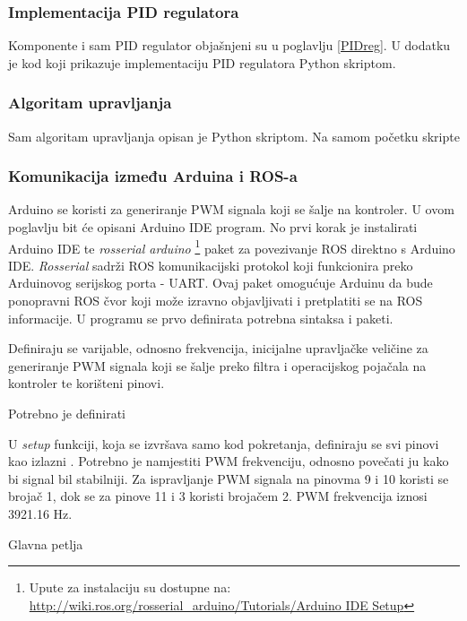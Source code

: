 \documentclass[times, utf8, diplomski]{fer}
\begin{document}
\subsubsection{Implementacija PID regulatora}
Komponente i sam PID regulator objašnjeni su u poglavlju \ref{PIDreg}. U dodatku je kod koji prikazuje implementaciju PID regulatora Python skriptom.
%

\subsubsection{Algoritam upravljanja}
Sam algoritam upravljanja opisan je Python skriptom. Na samom početku skripte 


\subsubsection{Komunikacija između Arduina i ROS-a}
Arduino se koristi za generiranje PWM signala koji se šalje na kontroler. U ovom poglavlju bit će opisani Arduino IDE program. No prvi korak je instalirati Arduino IDE te \emph{rosserial arduino} \footnote{Upute za instalaciju su dostupne na: \url{http://wiki.ros.org/rosserial_arduino/Tutorials/Arduino IDE Setup}} paket za povezivanje ROS direktno s Arduino IDE. \emph{Rosserial} sadrži ROS komunikacijski protokol koji funkcionira preko Arduinovog serijskog porta - UART. Ovaj paket omogućuje Arduinu da bude ponopravni ROS čvor koji može izravno objavljivati i pretplatiti se na ROS informacije.
U programu se prvo definirata potrebna sintaksa i paketi.

Definiraju se varijable, odnosno frekvencija, inicijalne upravljačke veličine za generiranje PWM signala koji se šalje preko filtra i operacijskog pojačala na kontroler te korišteni pinovi. 

Potrebno je definirati 

U \emph{setup} funkciji, koja se izvršava samo kod pokretanja, definiraju se svi pinovi kao izlazni . Potrebno je namjestiti PWM frekvenciju, odnosno povečati ju kako bi signal bil stabilniji. Za ispravljanje PWM signala na pinovma 9 i 10 koristi se brojač 1, dok se za pinove 11 i 3 koristi brojačem 2. PWM frekvencija iznosi 3921.16 Hz.

Glavna petlja 

\end{document}
